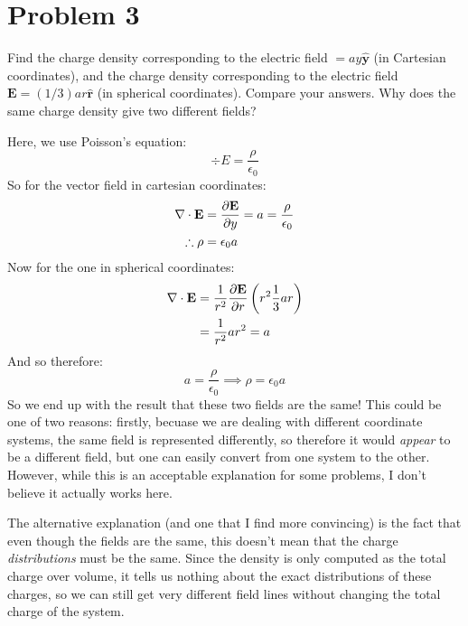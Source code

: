 \documentclass[10pt]{article}
\begin{document}
    \pagebreak

    \section*{Problem 3} 
    Find the charge density corresponding to the electric field $\mathbf = ay \mathbf{\hat y}$ (in Cartesian coordinates), and the charge density corresponding to the electric field $\mathbf E = (1/3) ar \mathbf{\hat r}$ (in spherical coordinates). Compare your answers. Why does the same charge density give two different fields?

    \begin{solution}
        Here, we use Poisson's equation: 
        \[ \div E = \frac{\rho}{\epsilon_0}\]
        So for the vector field in cartesian coordinates: 
        \begin{align*}
            \nabla \cdot \mathbf E &= \pdv{\mathbf E}{y} = a = \frac{\rho}{\epsilon_0}\\
            \therefore \rho &= \epsilon_0 a
        \end{align*}
        Now for the one in spherical coordinates: 
        \begin{align*}
            \nabla \cdot \mathbf E &= \frac{1}{r^2} \pdv{\mathbf E}{r} \left( r^2 \frac{1}{3} ar\right)\\
            &= \frac{1}{r^2} ar^2 = a
        \end{align*}
        And so therefore: 
        \[ a = \frac{\rho}{\epsilon_0} \implies \rho = \epsilon_0 a\]
        So we end up with the result that these two fields are the same! This could be one of two reasons: firstly, becuase we are dealing with different coordinate systems, the same field is represented differently, so therefore it would \textit{appear} to be a different field, but one can easily convert from one system to the other. However, while this is an acceptable explanation for some problems, I don't believe it actually works here. 

        The alternative explanation (and one that I find more convincing) is the fact that even though the fields are the same, this doesn't mean that the charge \textit{distributions} must be the same. Since the density is only computed as the total charge over volume, it tells us nothing about the exact distributions of these charges, so we can still get very different field lines without changing the total charge of the system.
    \end{solution}
\end{document}
